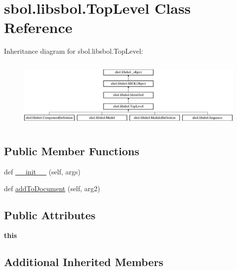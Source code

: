 \hypertarget{classsbol_1_1libsbol_1_1_top_level}{}\section{sbol.\+libsbol.\+Top\+Level Class Reference}
\label{classsbol_1_1libsbol_1_1_top_level}
Inheritance diagram for sbol.\+libsbol.\+Top\+Level\+:\begin{figure}[H]
\begin{center}
\leavevmode
\includegraphics[height=3.448276cm]{classsbol_1_1libsbol_1_1_top_level}
\end{center}
\end{figure}
\subsection*{Public Member Functions}
\begin{DoxyCompactItemize}
\item 
def \hyperlink{classsbol_1_1libsbol_1_1_top_level_a22abf31a9dc3e2074b03eb09f6398483}{\+\_\+\+\_\+init\+\_\+\+\_\+} (self, args)
\item 
def \hyperlink{classsbol_1_1libsbol_1_1_top_level_a94327e2aaf23d2788f39fc59feedd9cc}{add\+To\+Document} (self, arg2)
\end{DoxyCompactItemize}
\subsection*{Public Attributes}
\begin{DoxyCompactItemize}
\item 
{\bfseries this}\hypertarget{classsbol_1_1libsbol_1_1_top_level_aede346531ed7af0d9a5a328ccb72281d}{}\label{classsbol_1_1libsbol_1_1_top_level_aede346531ed7af0d9a5a328ccb72281d}

\end{DoxyCompactItemize}
\subsection*{Additional Inherited Members}


